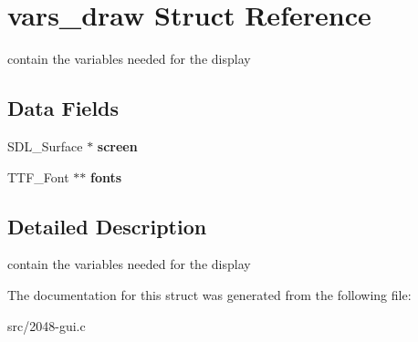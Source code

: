 \hypertarget{structvars__draw}{\section{vars\-\_\-draw Struct Reference}
\label{structvars__draw}
}


contain the variables needed for the display  


\subsection*{Data Fields}
\begin{DoxyCompactItemize}
\item 
\hypertarget{structvars__draw_a78fa3957d73de49cb81d047857504218}{S\-D\-L\-\_\-\-Surface $\ast$ {\bfseries screen}}\label{structvars__draw_a78fa3957d73de49cb81d047857504218}

\item 
\hypertarget{structvars__draw_aa5008d9463c422a331bc01967b5d942d}{T\-T\-F\-\_\-\-Font $\ast$$\ast$ {\bfseries fonts}}\label{structvars__draw_aa5008d9463c422a331bc01967b5d942d}

\end{DoxyCompactItemize}


\subsection{Detailed Description}
contain the variables needed for the display 

The documentation for this struct was generated from the following file\-:\begin{DoxyCompactItemize}
\item 
src/2048-\/gui.\-c\end{DoxyCompactItemize}
